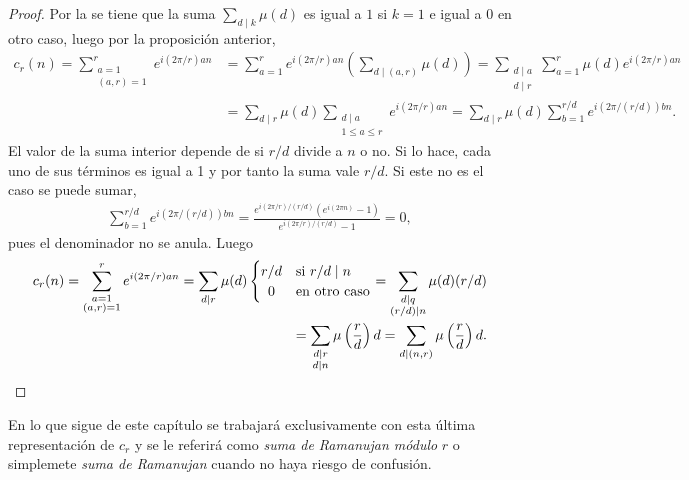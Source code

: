 \begin{proof}
Por la  se tiene que la suma $\sum_{d \mid k} \mu(d)$ es igual a $1$ si $k=1$ e igual a 0 en otro caso, luego por la proposición anterior,
\begin{align*}
    c_r(n) = \sum_{\substack{a=1 \\ (a,r)=1}}^{r} e^{i(2 \pi/r) a n} & = \sum_{a=1}^{r} e^{i(2 \pi / r) a n} \left( \sum_{d \mid (a,r)} \mu(d) \right) = \sum_{\substack{d \mid a \\ d \mid r}} \sum_{a=1}^{r}  \mu(d) e^{i(2 \pi / r) a n} \\
           & = \sum_{d \mid r} \mu(d) \sum_{\substack{d \mid a \\ 1 \le a \le r}} e^{i(2 \pi / r) a n} = \sum_{d \mid r} \mu(d) \sum_{b=1}^{r/d} e^{i (2 \pi / (r/d)) b n}.
\end{align*}
El valor de la suma interior depende de si $r/d$ divide a $n$ o no. Si lo hace, cada uno de sus términos es igual a 1 y por tanto la suma vale $r/d$. Si este no es el caso se puede sumar,
\begin{align*}
    \sum_{b=1}^{r/d} e^{i (2 \pi / (r/d)) b n} = \frac{e^{i(2 \pi / r) / (r/d)} (e^{i(2 \pi n)} - 1)}{e^{i(2 \pi / r) / (r/d)} - 1} = 0,
\end{align*}
pues el denominador no se anula. Luego
\begin{align*}
    c_r (n) = \sum_{\substack{a=1 \\ (a,r)=1}}^{r} e^{i(2 \pi/r) a n} = \sum_{d \mid r} \mu(d) \begin{cases}
               \hfil r/d & \text{si } r/d \mid n \\
               \hfil 0 & \text{en otro caso}
           \end{cases} = \sum_{\substack{d \mid q \\ (r/d) \mid n}} \mu(d) (r/d) \\
           = \sum_{\substack{d \mid r \\ d \mid n}} \mu \left( \frac{r}{d} \right) d = \sum_{d \mid (n,r)} \mu \left( \frac{r}{d} \right) d.
\end{align*}
\end{proof}

En lo que sigue de este capítulo se trabajará exclusivamente con esta última representación de $c_r$ y se le referirá como \emph{suma de Ramanujan módulo} $r$ o simplemete \emph{suma de Ramanujan} cuando no haya riesgo de confusión.

